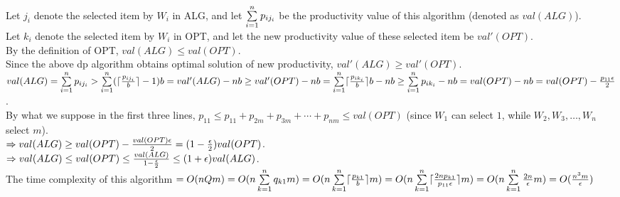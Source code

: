 \begin{pr}
Let $j_i$ denote the selected item by $W_i$ in ALG, and let $\sum\limits_{i=1}^np_{ij_i}$ be the productivity value of this algorithm (denoted as $val(ALG)$).\\
Let $k_i$ denote the selected item by $W_i$ in OPT, and let the new productivity value of these selected item be $val'(OPT)$.\\
By the definition of OPT, $val(ALG)\leq val(OPT)$.\\
Since the above dp algorithm obtains optimal solution of new productivity, $val'(ALG)\geq val'(OPT)$.\\
$val(ALG)=\sum\limits_{i=1}^np_{ij_i}>\sum\limits_{i=1}^n(\lceil\frac{p_{ij_i}}b\rceil-1)b=val'(ALG)-nb\geq val'(OPT)-nb=\sum\limits_{i=1}^n\lceil\frac{p_{ik_i}}b\rceil b-nb\geq\sum\limits_{i=1}^np_{ik_i}-nb=val(OPT)-nb=val(OPT)-\frac{p_{11}\epsilon}2$.\\
By what we suppose in the first three lines, $p_{11}\leq p_{11}+p_{2m}+p_{3m}+\cdots+p_{nm}\leq val(OPT)$ (since $W_1$ can select $1$, while $W_2, W_3, \dots, W_n$ select $m$).\\
$\Rightarrow val(ALG)\geq val(OPT)-\frac{val(OPT)\epsilon}2=(1-\frac{\epsilon}2)val(OPT)$.\\
$\Rightarrow val(ALG)\leq val(OPT)\leq\frac{val(ALG)}{1-\frac{\epsilon}2}\leq(1+\epsilon)val(ALG)$.\\
The time complexity of this algorithm $=O(nQm)=O(n\sum\limits_{k=1}^nq_{k1}m)=O(n\sum\limits_{k=1}^n\lceil\frac{p_{k1}}b\rceil m)=O(n\sum\limits_{k=1}^n\lceil\frac{2np_{k1}}{p_{11}\epsilon}\rceil m)=O(n\sum\limits_{k=1}^n\frac{2n}\epsilon m)=O(\frac{n^3m}\epsilon)$
\end{pr}
